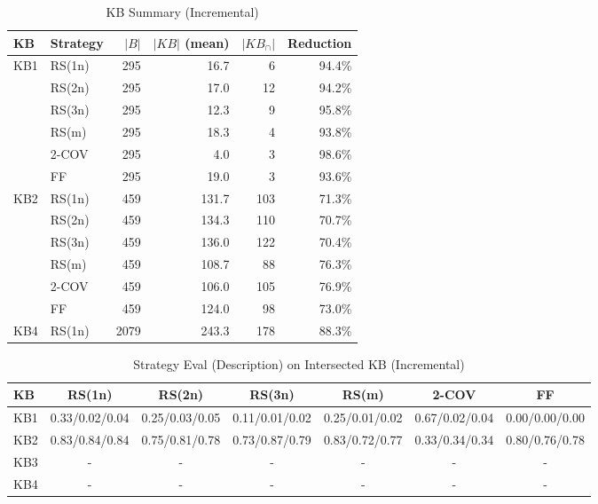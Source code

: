 \begin{table}[htbp]
\centering
\caption{KB Summary (Incremental)}
\label{tab:kb_summary_incremental}
\begin{tabular}{llrrrr}
\toprule
KB & Strategy & $|B|$ & $|KB|$ (mean) & $|KB_{\cap}|$ & Reduction \\
\midrule
KB1 & RS(1n) & 295 & 16.7 & 6 & 94.4\% \\
 & RS(2n) & 295 & 17.0 & 12 & 94.2\% \\
 & RS(3n) & 295 & 12.3 & 9 & 95.8\% \\
 & RS(m) & 295 & 18.3 & 4 & 93.8\% \\
 & 2-COV & 295 & 4.0 & 3 & 98.6\% \\
 & FF & 295 & 19.0 & 3 & 93.6\% \\
\midrule
KB2 & RS(1n) & 459 & 131.7 & 103 & 71.3\% \\
 & RS(2n) & 459 & 134.3 & 110 & 70.7\% \\
 & RS(3n) & 459 & 136.0 & 122 & 70.4\% \\
 & RS(m) & 459 & 108.7 & 88 & 76.3\% \\
 & 2-COV & 459 & 106.0 & 105 & 76.9\% \\
 & FF & 459 & 124.0 & 98 & 73.0\% \\
\midrule
KB4 & RS(1n) & 2079 & 243.3 & 178 & 88.3\% \\
\bottomrule
\end{tabular}
\end{table}

\begin{table}[htbp]
\centering
\caption{Strategy Eval (Description) on Intersected KB (Incremental)}
\label{tab:eval_description_incremental}
\begin{tabular}{lcccccc}
\toprule
KB & RS(1n) & RS(2n) & RS(3n) & RS(m) & 2-COV & FF \\
\midrule
KB1 & 0.33/0.02/0.04 & 0.25/0.03/0.05 & 0.11/0.01/0.02 & 0.25/0.01/0.02 & 0.67/0.02/0.04 & 0.00/0.00/0.00 \\
KB2 & 0.83/0.84/0.84 & 0.75/0.81/0.78 & 0.73/0.87/0.79 & 0.83/0.72/0.77 & 0.33/0.34/0.34 & 0.80/0.76/0.78 \\
KB3 & - & - & - & - & - & - \\
KB4 & - & - & - & - & - & - \\
\bottomrule
\end{tabular}
\end{table}

